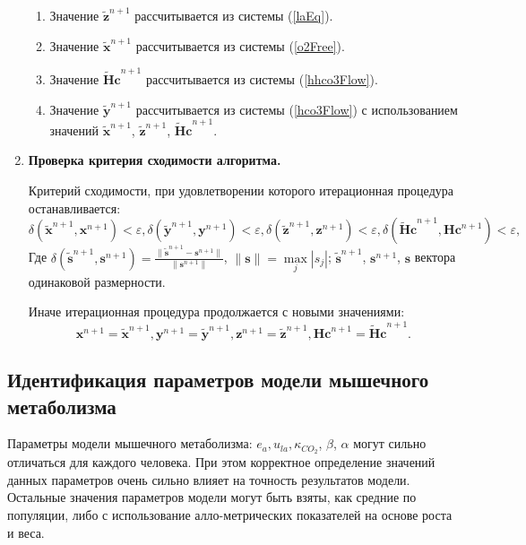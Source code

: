 \begin{enumerate}
\begin{enumerate}
	\item Значение $\tilde{\mathbf{z}}^{n+1}$ рассчитывается из системы (\ref{laEq}).
	
	\item Значение $\tilde{\mathbf{x}}^{n+1}$ рассчитывается из системы (\ref{o2Free}).
	
	\item Значение $\mathbf{\widetilde{H}c}^{n+1}$ рассчитывается из системы (\ref{hhco3Flow}).
	
	\item Значение $\tilde{\mathbf{y}}^{n+1}$ рассчитывается из системы (\ref{hco3Flow}) с использованием значений $\tilde{\mathbf{x}}^{n+1}$, $\tilde{\mathbf{z}}^{n+1}$, $\mathbf{\widetilde{H}c}^{n+1}$.

\end{enumerate}

	\item {\bf Проверка критерия сходимости алгоритма.}
	
	 Критерий сходимости, при удовлетворении которого итерационная процедура останавливается:
	\begin{equation*}
	\delta \left( \tilde{\mathbf{x}}^{n+1}, \mathbf{x}^{n+1} \right) < \varepsilon, \delta \left( \tilde{\mathbf{y}}^{n+1}, \mathbf{y}^{n+1} \right) < \varepsilon, \delta \left( \tilde{\mathbf{z}}^{n+1}, \mathbf{z}^{n+1} \right) < \varepsilon, \delta \left( \mathbf{\tilde{H}c}^{n+1}, \mathbf{Hc}^{n+1} \right) < \varepsilon,
	\end{equation*}
	Где $\delta \left( \tilde{\mathbf{s}}^{n+1}, \mathbf{s}^{n+1} \right) = \displaystyle \frac{\|\tilde{\mathbf{s}}^{n+1} - \mathbf{s}^{n+1}\|}{\|\mathbf{s}^{n+1}\|}$, $\|\mathbf{s}\| = \max \limits_j \left| s_j \right|$; $\tilde{\mathbf{s}}^{n+1}$, $\mathbf{s}^{n+1}$, $\mathbf{s}$ вектора одинаковой размерности. 
	
	Иначе итерационная процедура продолжается с новыми значениями:
	\begin{equation*}
	{\mathbf{x}}^{n+1} = \tilde{\mathbf{x}}^{n+1}, \mathbf{y}^{n+1} = \tilde{\mathbf{y}}^{n+1}, \mathbf{z}^{n+1} = \tilde{\mathbf{z}}^{n+1}, \mathbf{Hc}^{n+1} = \mathbf{\tilde{H}c}^{n+1}.
	\end{equation*}

\end{enumerate}

\subsection{Идентификация параметров модели мышечного метаболизма}
Параметры модели мышечного метаболизма: \(e_{a}, u_{la}, \kappa_{CO_{2}}\), $\beta$, $\alpha$ могут сильно отличаться для каждого человека. При этом корректное определение значений данных параметров очень сильно влияет на точность результатов модели. Остальные значения параметров модели могут быть взяты, как средние по популяции, либо с использование алло-метрических показателей на основе роста и веса.  

